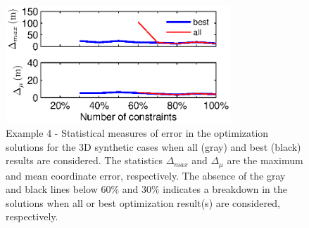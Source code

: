 \documentclass[extra, onecolumn, doublespacing]{gji}
\begin{document}
\begin{figure}
\noindent\includegraphics[width=20pc]{Figure4_c.eps}
\caption{Example 4 - Statistical measures of error in the
optimization solutions for the 3D synthetic cases when all (gray)
and best (black) results are considered. The statistics
$\Delta_{max}$ and $\Delta_\mu$ are the maximum and mean coordinate
error, respectively. The absence of the gray and black lines below
60\% and 30\% indicates a breakdown in the solutions when all or
best optimization result(s) are considered, respectively.}
\label{fig:optimisationresults-3Dsynth}
\end{figure}

\end{document}
